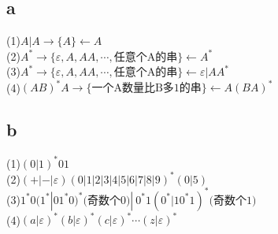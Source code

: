 \documentclass{article}
\title{
\vspace{2in}
\huge{\textbf{\hmwkClass \  \hmwkTitle}}\\
\vspace{2.5in}
}
\author{\textbf{\hmwkAuthorName}}
\date{\hmwkClassTime}
\begin{document}
\maketitle

\newpage
\subsection*{a}
\noindent
(1)\qquad$A|A \rightarrow \{A\} \leftarrow A$ \\
(2)\qquad$A^* \rightarrow \{\varepsilon , A,AA,\cdots,\text{任意个A的串}\} \leftarrow A^*$ \\
(3)\qquad$A^* \rightarrow \{\varepsilon , A,AA,\cdots,\text{任意个A的串}\} \leftarrow \varepsilon|AA^*$ \\
(4)\qquad$(AB)^*A \rightarrow \{\text{一个A数量比B多1的串}\} \leftarrow A(BA)^*$ \\
\subsection*{b}
\noindent
(1)\qquad$(0|1)^*01$\\
(2)\qquad$(+|-|\varepsilon)(0|1|2|3|4|5|6|7|8|9)^*(0|5)$\\
(3)\qquad$1^*0(1^* | 01^*0)^*\text{(奇数个0)}  |\  0^*1(0^* | 10^*1)^*\text{(奇数个1)} $\\
(4)\qquad$(a|\varepsilon)^*(b|\varepsilon)^*(c|\varepsilon)^*\cdots (z|\varepsilon)^*$\\
\end{document}
